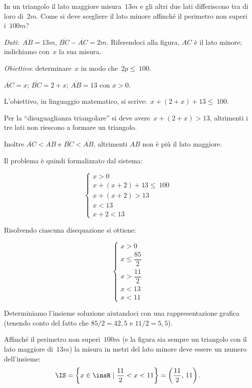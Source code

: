 \begin{problema}
 In un triangolo il lato maggiore misura~$13\unit{m}$ e gli altri due lati
differiscono tra di loro di~$2\unit{m}$. Come si deve scegliere il lato minore
affinché il perimetro non superi i~$100\unit{m}$?
\end{problema}

\emph{Dati}:~$\overline{AB}=13\unit{m}$, $\overline{BC}-\overline{AC}=2\unit{m}$.
Riferendoci alla figura, $AC$ è il lato minore; indichiamo con~$x$ la sua
misura.
\begin{center}
 
\end{center}

\emph{Obiettivo}: determinare~$x$ in modo che~$2p\le~100$.

\begin{soluzione}
 $\overline{AC}=x$; $\overline{BC}=2+x$; $\overline{AB}=13$ con $x>0$.

L'obiettivo, in linguaggio matematico, si scrive:~$x+(2+x)+13\le~100$.


Per la ``disuguaglianza triangolare''
si deve avere~$x+(2+x)>13$, altrimenti i tre lati non riescono a formare un triangolo.

Inoltre $\overline{AC}<\overline{AB}$ e $\overline{BC}<\overline{AB}$, altrimenti $AB$ non è più il lato maggiore.

Il problema è quindi formalizzato dal sistema:

\[\left\{%
\begin{array}{l}
x>0\\
x+(x+2)+13\le~100\\
x+(x+2)>13\\
x<13\\
x+2<13
\end{array}
\right.\]

Risolvendo ciascuna disequazione si ottiene:

{\longarray\[\left\{%
\begin{array}{l}
x>0\\
x\le\dfrac{85}{2}\\
x>\dfrac{11}{2}\\
x<13\\
x<11
\end{array}
\right.\]}

Determiniamo l'insieme soluzione aiutandoci con una
rappresentazione grafica (tenendo conto del fatto che $85/2 = 42,5$ e $11/2=5,5$).
\begin{center}
 
\end{center}
Affinché il perimetro non superi~$100\unit{m}$ (e la figura sia sempre un triangolo con il lato maggiore di~$13\unit{m}$) la misura in metri del
lato minore deve essere un numero dell'insieme:
\[\IS=\left\{x\in \insR\mid \frac{11}{2}<x<11\right\} = \left(\frac{11}{2}\text{,~}11\right).\]
\end{soluzione}

